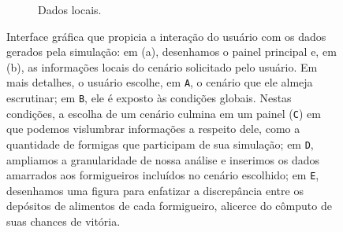 \documentclass[12pt,oneside,a4paper]{article}
\begin{document}
\begin{figure}
\begin{subfigure}{.49\textwidth}
		\caption{Dados locais.} 
	\end{subfigure} 
	\caption{Interface gráfica que propicia a interação do usuário com os dados gerados pela simulação: em (a), desenhamos o painel principal e, em (b), as informações locais do cenário solicitado pelo usuário. Em mais detalhes, o usuário escolhe, em \texttt{A}, o cenário que ele almeja escrutinar; em \texttt{B}, ele é exposto às condições globais. Nestas condições, a escolha de um cenário culmina em um painel (\texttt{C}) em que podemos vislumbrar informações a respeito dele, como a quantidade de formigas que participam de sua simulação; em \texttt{D}, ampliamos a granularidade de nossa análise e inserimos os dados amarrados aos formigueiros incluídos no cenário escolhido; em \texttt{E}, desenhamos uma figura para enfatizar a discrepância entre os depósitos de alimentos de cada formigueiro, alicerce do cômputo de suas chances de vitória.} 
\end{figure} 
\end{document}
